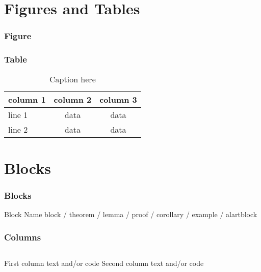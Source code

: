 \section{Figures and Tables}
\begin{frame}
  \frametitle{Figure}
  \end{frame}

\begin{frame}
  \frametitle{Table}
  \begin{table}[tb]
    \centering
    \caption{Caption here\label{tab:tablename}}
    \begin{tabular}{l|cc} \hline
    \textbf{column 1} & \textbf{column 2} & \textbf{column 3} \\ \hline
    line 1 & data & data \\ \hline
    line 2 & data & data \\ \hline
    \end{tabular}
    \end{table}
  \end{frame}
\section{Blocks}
\begin{frame}
  \frametitle{Blocks}
  \begin{block}{Block Name}
    block / theorem / lemma / proof / corollary / example / alartblock
  \end{block}
  \end{frame}

\begin{frame}
  \frametitle{Columns}
  \begin{columns}
    First column text and/or code
    Second column text and/or code
    \end{columns}
\end{frame}